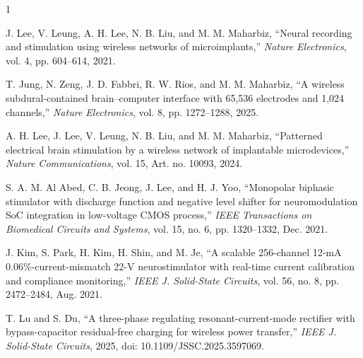 \documentclass[lettersize,journal]{IEEEtran}
\begin{document}
\begin{thebibliography}{1}


J. Lee, V. Leung, A. H. Lee, N. B. Liu, and M. M. Maharbiz, ``Neural recording and stimulation using wireless networks of microimplants,'' \textit{Nature Electronics}, vol. 4, pp. 604--614, 2021.

T. Jung, N. Zeng, J. D. Fabbri, R. W. Rios, and M. M. Maharbiz, ``A wireless subdural-contained brain--computer interface with 65,536 electrodes and 1,024 channels,'' \textit{Nature Electronics}, vol. 8, pp. 1272--1288, 2025.

A. H. Lee, J. Lee, V. Leung, N. B. Liu, and M. M. Maharbiz, ``Patterned electrical brain stimulation by a wireless network of implantable microdevices,'' \textit{Nature Communications}, vol. 15, Art. no. 10093, 2024.

S. A. M. Al Abed, C. B. Jeong, J. Lee, and H. J. Yoo, ``Monopolar biphasic stimulator with discharge function and negative level shifter for neuromodulation SoC integration in low-voltage CMOS process,'' \textit{IEEE Transactions on Biomedical Circuits and Systems}, vol. 15, no. 6, pp. 1320--1332, Dec. 2021.

J. Kim, S. Park, H. Kim, H. Shin, and M. Je, ``A scalable 256-channel 12-mA 0.06\%-current-mismatch 22-V neurostimulator with real-time current calibration and compliance monitoring,'' \textit{IEEE J. Solid-State Circuits}, vol. 56, no. 8, pp. 2472--2484, Aug. 2021.

T. Lu and S. Du, ``A three-phase regulating resonant-current-mode rectifier with bypass-capacitor residual-free charging for wireless power transfer,'' \textit{IEEE J. Solid-State Circuits}, 2025, doi: 10.1109/JSSC.2025.3597069.



\end{thebibliography}


\newpage

\vfill
\end{document}
